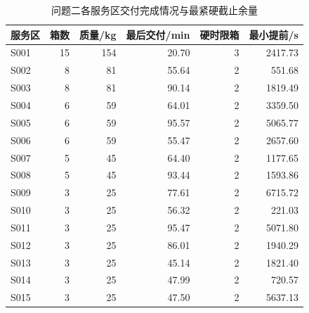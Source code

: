 \begin{table}[H]\centering\normalsize
\caption{问题二各服务区交付完成情况与最紧硬截止余量}\label{tab:q2_service_delivery}
\begin{tabular}{lrrrrr}
\toprule
服务区 & 箱数 & 质量/kg & 最后交付/min & 硬时限箱 & 最小提前/s\\\midrule
S001 & 15 & 154 & 20.70 & 3 & 2417.73\\
S002 & 8 & 81 & 55.64 & 2 & 551.68\\
S003 & 8 & 81 & 90.14 & 2 & 1819.49\\
S004 & 6 & 59 & 64.01 & 2 & 3359.50\\
S005 & 6 & 59 & 95.57 & 2 & 5065.77\\
S006 & 6 & 59 & 55.47 & 2 & 2657.60\\
S007 & 5 & 45 & 64.40 & 2 & 1177.65\\
S008 & 5 & 45 & 93.44 & 2 & 1593.86\\
S009 & 3 & 25 & 77.61 & 2 & 6715.72\\
S010 & 3 & 25 & 56.32 & 2 & 221.03\\
S011 & 3 & 25 & 95.47 & 2 & 5071.80\\
S012 & 3 & 25 & 86.01 & 2 & 1940.29\\
S013 & 3 & 25 & 45.14 & 2 & 1821.40\\
S014 & 3 & 25 & 47.99 & 2 & 720.57\\
S015 & 3 & 25 & 47.50 & 2 & 5637.13\\
\bottomrule\end{tabular}
\end{table}
